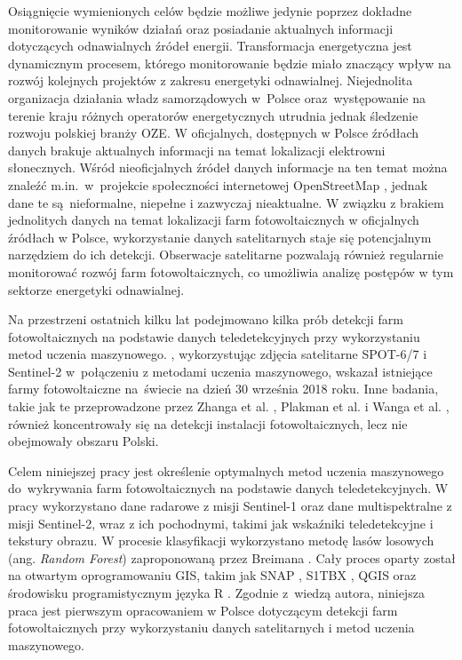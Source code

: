 \documentclass{amuthesis}
\begin{document}
Osiągnięcie wymienionych celów będzie możliwe jedynie poprzez dokładne
monitorowanie wyników działań oraz posiadanie aktualnych informacji
dotyczących odnawialnych źródeł energii. Transformacja energetyczna jest
dynamicznym procesem, którego monitorowanie będzie miało znaczący wpływ
na rozwój kolejnych projektów z zakresu energetyki odnawialnej.
Niejednolita organizacja działania władz samorządowych w~Polsce
oraz~występowanie na terenie kraju różnych operatorów energetycznych
utrudnia jednak śledzenie rozwoju polskiej branży OZE. W oficjalnych,
dostępnych w Polsce źródłach danych brakuje aktualnych informacji na
temat lokalizacji elektrowni słonecznych. Wśród nieoficjalnych źródeł
danych informacje na ten temat można znaleźć m.in.~w~projekcie
społeczności internetowej OpenStreetMap \autocite{OpenStreetMap}, jednak
dane te są~nieformalne, niepełne i zazwyczaj nieaktualne. W związku z
brakiem jednolitych danych na temat lokalizacji farm fotowoltaicznych w
oficjalnych źródłach w Polsce, wykorzystanie danych satelitarnych staje
się potencjalnym narzędziem do ich detekcji. Obserwacje satelitarne
pozwalają również regularnie monitorować rozwój farm fotowoltaicznych,
co umożliwia analizę postępów w tym sektorze energetyki odnawialnej.

Na przestrzeni ostatnich kilku lat podejmowano kilka prób detekcji farm
fotowoltaicznych na podstawie danych teledetekcyjnych przy wykorzystaniu
metod uczenia maszynowego. \textcite{kruitwagen_2021_pv}, wykorzystując
zdjęcia satelitarne SPOT-6/7 i Sentinel-2 w~połączeniu z metodami
uczenia maszynowego, wskazał istniejące farmy fotowoltaiczne na~świecie
na dzień 30 września 2018 roku. Inne badania, takie jak te
przeprowadzone przez Zhanga et al. \autocite*{zhang_2021_texture},
Plakman et al. \autocite*{plakman_2022_pv} i Wanga et al.
\autocite*{wang_2022_pv}, również koncentrowały się na detekcji
instalacji fotowoltaicznych, lecz nie obejmowały obszaru Polski.

Celem niniejszej pracy jest określenie optymalnych metod uczenia
maszynowego do~wykrywania farm fotowoltaicznych na podstawie danych
teledetekcyjnych. W pracy wykorzystano dane radarowe z misji Sentinel-1
oraz dane multispektralne z misji Sentinel-2, wraz z ich pochodnymi,
takimi jak wskaźniki teledetekcyjne i tekstury obrazu. W procesie
klasyfikacji wykorzystano metodę lasów losowych (ang. \emph{Random
Forest}) zaproponowaną przez Breimana \autocite*{breiman_2001_rf}. Cały
proces oparty został na otwartym oprogramowaniu GIS, takim jak SNAP
\autocite{snap}, S1TBX \autocite{s1tbx}, QGIS \autocite{qgis} oraz
środowisku programistycznym języka R \autocite{R-base}. Zgodnie z~wiedzą
autora, niniejsza praca jest pierwszym opracowaniem w Polsce dotyczącym
detekcji farm fotowoltaicznych przy wykorzystaniu danych satelitarnych i
metod uczenia maszynowego.
\end{document}
